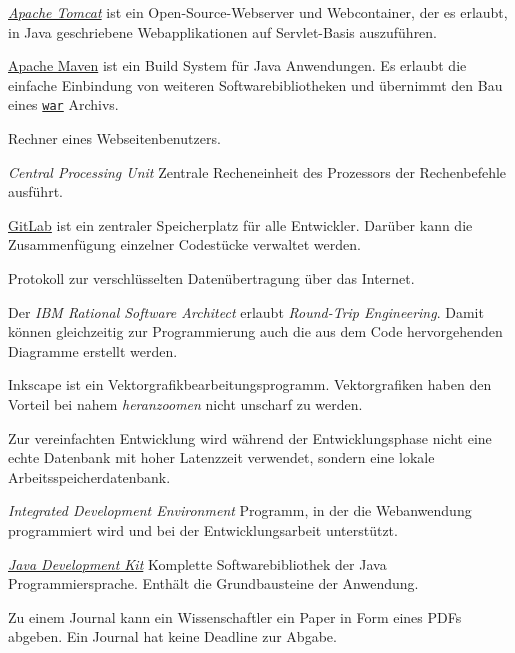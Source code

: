 
\begin{description}

	 \href{http://tomcat.apache.org/}{\emph{Apache Tomcat}} ist ein Open-Source-Webserver und Webcontainer, der es erlaubt, in Java geschriebene Webapplikationen auf Servlet-Basis auszuführen.

	 \href{https://maven.apache.org/what-is-maven.html}{Apache Maven} ist ein Build System für Java Anwendungen. Es erlaubt die einfache Einbindung von weiteren Softwarebibliotheken und übernimmt den Bau eines \hyperref[glo:war]{\texttt{war}} Archivs.

	 Rechner eines Webseitenbenutzers.

	 \emph{Central Processing Unit} Zentrale Recheneinheit des Prozessors der Rechenbefehle ausführt.

	 \href{https://fimgit.fim.uni-passau.de/users/sign_in}{GitLab} ist ein zentraler Speicherplatz für alle Entwickler. Darüber kann die Zusammenfügung einzelner Codestücke verwaltet werden.

	 Protokoll zur verschlüsselten Datenübertragung über das Internet.

	 Der \emph{IBM Rational Software Architect} erlaubt \emph{Round-Trip Engineering}. Damit können gleichzeitig zur Programmierung auch die aus dem Code hervorgehenden Diagramme erstellt werden.

	 Inkscape ist ein Vektorgrafikbearbeitungsprogramm. Vektorgrafiken haben den Vorteil bei nahem \emph{heranzoomen} nicht unscharf zu werden.

	 Zur vereinfachten Entwicklung wird während der Entwicklungsphase nicht eine echte Datenbank mit hoher Latenzzeit verwendet, sondern eine lokale Arbeitsspeicherdatenbank.

	 \emph{Integrated Development Environment} Programm, in der die Webanwendung programmiert wird und bei der Entwicklungsarbeit unterstützt.

	 \href{https://www.oracle.com/java/technologies/downloads/}{\emph{Java Development Kit}} Komplette Softwarebibliothek der Java Programmiersprache. Enthält die Grundbausteine der Anwendung.

	 Zu einem Journal kann ein Wissenschaftler ein Paper in Form eines PDFs abgeben. Ein Journal hat keine Deadline zur Abgabe.


\end{description}

